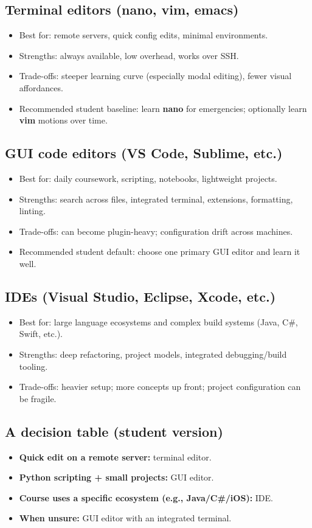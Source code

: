 \subsection{Terminal editors (nano, vim, emacs)}
\begin{itemize}
\item Best for: remote servers, quick config edits, minimal environments.
\item Strengths: always available, low overhead, works over SSH.
\item Trade-offs: steeper learning curve (especially modal editing), fewer visual affordances.
\item Recommended student baseline: learn \textbf{nano} for emergencies; optionally learn \textbf{vim} motions over time.
\end{itemize}

\subsection{GUI code editors (VS Code, Sublime, etc.)}
\begin{itemize}
\item Best for: daily coursework, scripting, notebooks, lightweight projects.
\item Strengths: search across files, integrated terminal, extensions, formatting, linting.
\item Trade-offs: can become plugin-heavy; configuration drift across machines.
\item Recommended student default: choose one primary GUI editor and learn it well.
\end{itemize}

\subsection{IDEs (Visual Studio, Eclipse, Xcode, etc.)}
\begin{itemize}
\item Best for: large language ecosystems and complex build systems (Java, C\#, Swift, etc.).
\item Strengths: deep refactoring, project models, integrated debugging/build tooling.
\item Trade-offs: heavier setup; more concepts up front; project configuration can be fragile.
\end{itemize}

\subsection{A decision table (student version)}
\begin{itemize}
\item \textbf{Quick edit on a remote server:} terminal editor.
\item \textbf{Python scripting + small projects:} GUI editor.
\item \textbf{Course uses a specific ecosystem (e.g., Java/C\#/iOS):} IDE.
\item \textbf{When unsure:} GUI editor with an integrated terminal.
\end{itemize}


